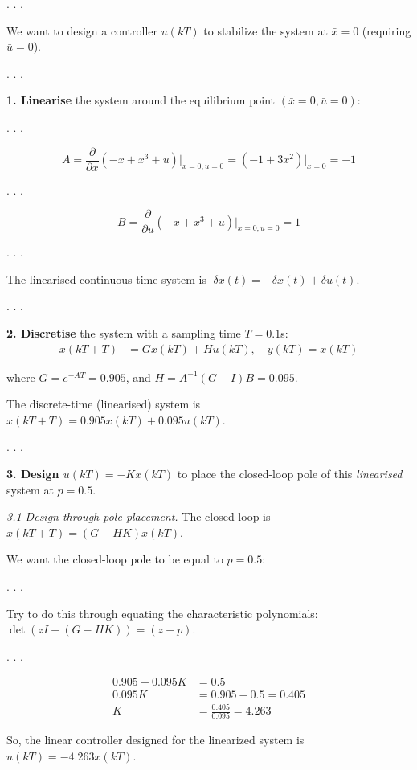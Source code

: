\documentclass[
  letterpaper,
  DIV=11,
  numbers=noendperiod,
  oneside]{scrartcl}
\begin{document}
. . .

We want to design a controller \(u(kT)\) to stabilize the system at
\(\bar x = 0\) (requiring \(\bar u = 0\)).

. . .

\textbf{1. Linearise} the system around the equilibrium point
\((\bar x=0, \bar u=0)\):

. . .

\[ 
A = \frac{\partial}{\partial x}(-x + x^3 + u) \Big|_{x=0, u=0} = (-1 + 3x^2)\Big|_{x=0} = -1 
\]

. . .

\[ 
B = \frac{\partial}{\partial u}(-x + x^3 + u) \Big|_{x=0, u=0} = 1
\]

. . .

The linearised continuous-time system is
\(\;\boxed{\delta\dot{x}(t) = -\delta x(t) + \delta u(t)}\).

. . .

\textbf{2. Discretise} the system with a sampling time \(T=0.1\)s: \[
\begin{align*} x(kT+T) &= Gx(kT) + Hu(kT), \quad y(kT) = x(kT) \end{align*}
\]

where \(G = e^{-AT} = 0.905\), and \(H = A^{-1}(G-I)B = 0.095\).

The discrete-time (linearised) system is
\(\boxed{x(kT+T) = 0.905x(kT) + 0.095u(kT)}\).

. . .

\textbf{3. Design \(u(kT) = -K x(kT)\)} to place the closed-loop pole of
this \emph{linearised} system at \(p = 0.5\).

\emph{3.1 Design through pole placement.} The closed-loop is
\(x(kT+T) = (G - H K) x(kT)\).

We want the closed-loop pole to be equal to \(p=0.5\):

. . .

Try to do this through equating the characteristic polynomials:
\(\det(zI - (G-HK)) = (z-p)\).

. . .

\[
\begin{align*} 0.905 - 0.095 K &= 0.5 \\ 0.095 K &= 0.905 - 0.5 = 0.405 \\ K &= \frac{0.405}{0.095} = 4.263 \end{align*}
\]

So, the linear controller designed for the linearized system is
\(\boxed{u(kT) = -4.263 x(kT)}\).
\end{document}
